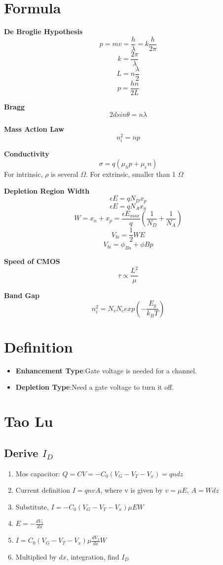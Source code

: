 \documentclass{article}
\begin{document}
\Large
  \section{Formula}
  
   \textbf{De Broglie Hypothesis}
   $$p = mv = \frac{h}{\lambda} = k\frac{h}{2\pi}$$
   $$ k = \frac{2\pi}{\lambda} $$  
   $$L = n\frac{\lambda}{2}$$
   $$ p = \frac{hn}{2L}$$
   
   \textbf{Bragg}
   $$2dsin\theta = n\lambda$$
  
  \textbf{Mass Action Law}
  $$n_i^2 = np$$
  
  \textbf{Conductivity}
  $$\sigma = q(\mu_hp+\mu_en)$$  
  For intrinsic, $\rho$ is several $\Omega$. For extrinsic, smaller than 1 $\Omega$
  
  \textbf{Depletion Region Width}
  $$ \epsilon E = qN_Dx_p $$
  $$ \epsilon E = qN_Ax_n$$ 
  $$W = x_n + x_p = \frac{\epsilon E_{max}}{q}(\frac{1}{N_D} + \frac{1}{N_A})$$
  $$V_{bi} = \frac{1}{2}WE$$
  $$V_{bi} = \phi_{Bn} + \phi{Bp}$$
  
  \textbf{Speed of CMOS}
  $$\tau \propto \frac{L^2}{\mu}$$ 
  
  \textbf{Band Gap}
  $$n_i^2 = N_vN_cexp(-\frac{E_g}{k_BT}) $$
  
  \section{Definition}
  \begin{itemize}
    \item \textbf{Enhancement Type}:Gate voltage is needed for a channel.
    \item \textbf{Depletion Type}:Need a gate voltage to turn it off.
  \end{itemize}
  \section{Tao Lu}
  \subsection{Derive $I_D$}
   \begin{enumerate}
     \item Mos capacitor: $Q = CV = -C_0(V_G - V_T - V_x) = qndz$
     \item Current definition $I = qnvA$, where v is given by $v = \mu E$, $A = Wdz$
     \item Substitute, $I = -C_0(V_G - V_T - V_x)\mu E W$
     \item $E = -\frac{dV_x}{dx}$
     \item $I = C_0(V_G - V_T - V_x)\mu \frac{dV_x}{dx} W$
     \item Multiplied by $dx$, integration, find $I_D$
   \end{enumerate}
   
\end{document}
